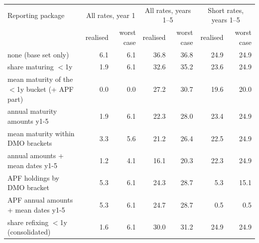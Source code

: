 \begin{tabular}{lrrrrrr}
\toprule
Reporting package & \multicolumn{2}{c}{All rates, year 1} & \multicolumn{2}{c}{All rates, years 1--5} & \multicolumn{2}{c}{Short rates, years 1--5} \\
 & realised & worst case & realised & worst case & realised & worst case \\
\midrule
none (base set only) & 6.1 & 6.1 & 36.8 & 36.8 & 24.9 & 24.9 \\
share maturing $<$1y & 1.9 & 6.1 & 32.6 & 35.2 & 23.6 & 24.9 \\
mean maturity of the $<$1y bucket (+ APF part) & 0.0 & 0.0 & 27.2 & 30.7 & 19.6 & 20.0 \\
annual maturity amounts y1-5 & 1.9 & 6.1 & 22.3 & 28.0 & 23.4 & 24.9 \\
mean maturity within DMO brackets & 3.3 & 5.6 & 21.2 & 26.4 & 22.5 & 24.9 \\
annual amounts + mean dates y1-5 & 1.2 & 4.1 & 16.1 & 20.3 & 22.3 & 24.9 \\
APF holdings by DMO bracket & 5.3 & 6.1 & 24.3 & 28.7 & 5.3 & 15.1 \\
APF annual amounts + mean dates y1-5 & 5.3 & 6.1 & 24.7 & 28.7 & 0.5 & 0.5 \\
share refixing $<$1y (consolidated) & 1.6 & 6.1 & 30.0 & 31.2 & 24.9 & 24.9 \\
\bottomrule
\end{tabular}
